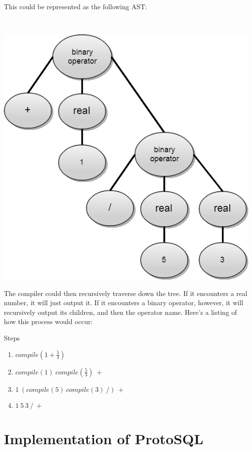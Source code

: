 \documentclass[titlepage]{article}
\begin{document}
			This could be represented as the following AST:
			\newline

			~\centerline{\includegraphics[scale=.5]{ExampleCompileBinaryAST.png}}
			\newline

			The compiler could then recursively traverse down the tree.  If it encounters a real number, it will just output it.  If it encounters a binary operator, however, it will recursively output its children, and then the operator name.  Here's a listing of how this process would occur:
			\newline

			Steps
			\begin{enumerate}
				\itemsep0em
				\item $compile(1 + \frac{5}{3})$
				\item $compile(1)\ compile(\frac{5}{3})\ +$
				\item $1\ (compile(5)\ compile(3)\ /)\ +$
				\item $1\ 5\ 3\ /\ +$
				\newline
			\end{enumerate}

	\section{Implementation of ProtoSQL}
\end{document}
